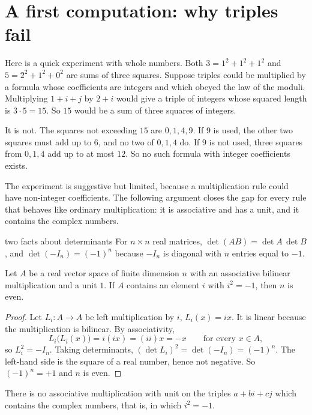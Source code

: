 \section{A first computation: why triples fail}

Here is a quick experiment with whole numbers. Both $3=1^2+1^2+1^2$ and $5=2^2+1^2+0^2$ are sums of three squares. Suppose triples could be multiplied by a formula whose coefficients are integers and which obeyed the law of the moduli. Multiplying $1+i+j$ by $2+i$ would give a triple of integers whose squared length is $3\cdot5=15$. So $15$ would be a sum of three squares of integers.

It is not. The squares not exceeding $15$ are $0,1,4,9$. If $9$ is used, the other two squares must add up to $6$, and no two of $0,1,4$ do. If $9$ is not used, three squares from $0,1,4$ add up to at most $12$. So no such formula with integer coefficients exists.

The experiment is suggestive but limited, because a multiplication rule could have non-integer coefficients. The following argument closes the gap for every rule that behaves like ordinary multiplication: it is associative and has a unit, and it contains the complex numbers.

\begin{toolbox}{two facts about determinants}
For $n\times n$ real matrices, $\det(AB)=\det A\,\det B$, and $\det(-I_n)=(-1)^n$ because $-I_n$ is diagonal with $n$ entries equal to $-1$.
\end{toolbox}

\begin{theorem}\label{thm:three-odd}
Let $A$ be a real vector space of finite dimension $n$ with an associative bilinear multiplication and a unit $1$. If $A$ contains an element $i$ with $i^2=-1$, then $n$ is even.
\end{theorem}

\begin{proof}
Let $L_i\colon A\to A$ be left multiplication by $i$, $L_i(x)=ix$. It is linear because the multiplication is bilinear. By associativity,
\[
  L_i\bigl(L_i(x)\bigr)=i(ix)=(ii)x=-x\qquad\text{for every }x\in A ,
\]
so $L_i^2=-I_n$. Taking determinants, $(\det L_i)^2=\det(-I_n)=(-1)^n$. The left-hand side is the square of a real number, hence not negative. So $(-1)^n=+1$ and $n$ is even.
\end{proof}

\begin{corollary}\label{cor:three-triples}
There is no associative multiplication with unit on the triples $a+bi+cj$ which contains the complex numbers, that is, in which $i^2=-1$.
\end{corollary}

